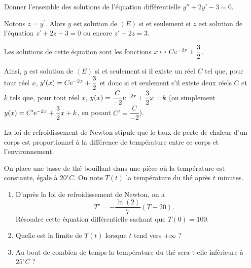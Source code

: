 \documentclass[11pt,fleqn, openany]{book} %
\begin{document}
 

\begin{exercise}[topic=diff03]Donner l'ensemble des solutions de l'équation différentielle $y''+2y'-3=0$.\end{exercise}

\begin{solution}
Notons \(z=y^{\prime}\). Alors \(y\) est solution de \((E)\) si et seulement si \(z\) est solution de l'équation \(z'+2z-3=0\) ou encore \(z'+2z=3\).

Les solutions de cette équation sont les fonctions \(x\mapsto C\mathrm{e}^{-2x}+\dfrac{3}{2}\). 

Ainsi, \(y\) est solution de \((E)\) si et seulement si il existe un réel \(C\) tel que, pour tout réel \(x\), \(y'(x)=C\mathrm{e}^{-2x}+\dfrac{3}{2}\) et donc si et seulement s'il existe deux réels \(C\) et \(k\) tels que, pour tout réel \(x\), \(y(x)=\dfrac{C}{-2}\mathrm{e}^{-2x}+\dfrac{3}{2}x+k\) (ou simplement \(y(x)=C'\mathrm{e}^{-2x}+\dfrac{3}{2}x+k\), en posant \(C'=\dfrac{C}{-2}\)).

 \end{solution}
 
 

\begin{exercise}[topic=diff03, subtitle={(Loi de refroidissement de Newton)}] La loi de refroidissement de Newton stipule que le taux de perte de chaleur d'un corps est proportionnel à la différence de température entre ce corps et l'environnement. 

On place une tasse de thé bouillant dans une pièce où la température est constante, égale à $20^{\circ}C$. On note $T(t)$ la température du thé après $t$ minutes.
\begin{enumerate}
\item D'après la loi de refroidissement de Newton, on a
\[T'=-\dfrac{\ln(2)}{7}(T-20).\]
Résoudre cette équation différentielle sachant que $T(0)=100$.
\item Quelle est la limite de $T(t)$ lorsque $t$ tend vers $+\infty$ ?
\item Au bout de combien de temps la température du thé sera-t-elle inférieure à $25^{\circ}C$ ?
\end{enumerate} \end{exercise}
\end{document}
